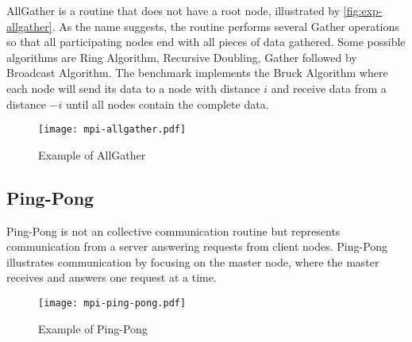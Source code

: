 			AllGather is a routine that does not have a root node, illustrated by
			\autoref{fig:exp-allgather}. As the name suggests, the routine performs
			several Gather operations so that all participating nodes end with all
			pieces of data gathered. Some possible algorithms are Ring Algorithm,
			Recursive Doubling, Gather followed by Broadcast Algorithm. The benchmark
			implements the Bruck Algorithm where each node will send its data to a node
			with distance $i$ and receive data from a distance $-i$ until all nodes
			contain the complete data.

			\begin{figure}[!tb]
				\centering%
				\caption{Example of \mpi AllGather}%
				\label{fig:exp-allgather}%
				\texttt{[image: mpi-allgather.pdf]}%
			\end{figure}

		\subsection{Ping-Pong}

			Ping-Pong is not an \mpi collective communication routine but represents
			communication from a server answering requests from client nodes.
			Ping-Pong illustrates communication by focusing on the master node,
			where the master receives and answers one request at a time.

			\begin{figure}[!tb]
			    \centering%
			    \caption{Example of Ping-Pong}%
			    \label{fig:exp-ping-pong}%
			    \texttt{[image: mpi-ping-pong.pdf]}%
			\end{figure}

